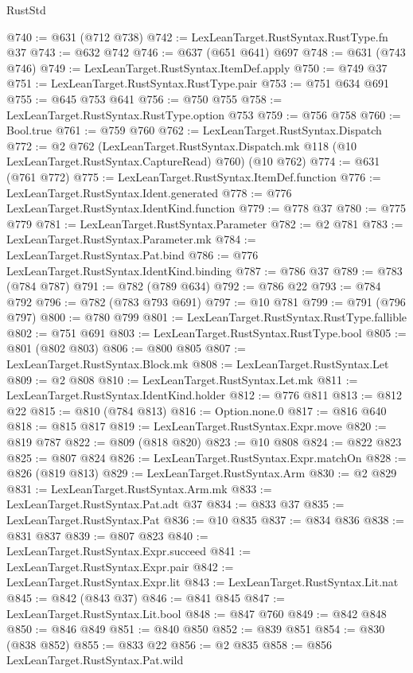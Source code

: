 \begin{lexlean}{RustStd}
\begin{coremodule}
@740 := @631 (@712 @738)
@742 := LexLeanTarget.RustSyntax.RustType.fn @37
@743 := @632 @742
@746 := @637 (@651 @641) @697
@748 := @631 (@743 @746)
@749 := LexLeanTarget.RustSyntax.ItemDef.apply
@750 := @749 @37
@751 := LexLeanTarget.RustSyntax.RustType.pair
@753 := @751 @634 @691
@755 := @645 @753 @641
@756 := @750 @755
@758 := LexLeanTarget.RustSyntax.RustType.option @753
@759 := @756 @758
@760 := Bool.true
@761 := @759 @760
@762 := LexLeanTarget.RustSyntax.Dispatch
@772 := @2
    @762
    (LexLeanTarget.RustSyntax.Dispatch.mk @118 (@10 LexLeanTarget.RustSyntax.CaptureRead) @760)
    (@10 @762)
@774 := @631 (@761 @772)
@775 := LexLeanTarget.RustSyntax.ItemDef.function
@776 := LexLeanTarget.RustSyntax.Ident.generated
@778 := @776 LexLeanTarget.RustSyntax.IdentKind.function
@779 := @778 @37
@780 := @775 @779
@781 := LexLeanTarget.RustSyntax.Parameter
@782 := @2 @781
@783 := LexLeanTarget.RustSyntax.Parameter.mk
@784 := LexLeanTarget.RustSyntax.Pat.bind
@786 := @776 LexLeanTarget.RustSyntax.IdentKind.binding
@787 := @786 @37
@789 := @783 (@784 @787)
@791 := @782 (@789 @634)
@792 := @786 @22
@793 := @784 @792
@796 := @782 (@783 @793 @691)
@797 := @10 @781
@799 := @791 (@796 @797)
@800 := @780 @799
@801 := LexLeanTarget.RustSyntax.RustType.fallible
@802 := @751 @691
@803 := LexLeanTarget.RustSyntax.RustType.bool
@805 := @801 (@802 @803)
@806 := @800 @805
@807 := LexLeanTarget.RustSyntax.Block.mk
@808 := LexLeanTarget.RustSyntax.Let
@809 := @2 @808
@810 := LexLeanTarget.RustSyntax.Let.mk
@811 := LexLeanTarget.RustSyntax.IdentKind.holder
@812 := @776 @811
@813 := @812 @22
@815 := @810 (@784 @813)
@816 := Option.none.{0}
@817 := @816 @640
@818 := @815 @817
@819 := LexLeanTarget.RustSyntax.Expr.move
@820 := @819 @787
@822 := @809 (@818 @820)
@823 := @10 @808
@824 := @822 @823
@825 := @807 @824
@826 := LexLeanTarget.RustSyntax.Expr.matchOn
@828 := @826 (@819 @813)
@829 := LexLeanTarget.RustSyntax.Arm
@830 := @2 @829
@831 := LexLeanTarget.RustSyntax.Arm.mk
@833 := LexLeanTarget.RustSyntax.Pat.adt @37
@834 := @833 @37
@835 := LexLeanTarget.RustSyntax.Pat
@836 := @10 @835
@837 := @834 @836
@838 := @831 @837
@839 := @807 @823
@840 := LexLeanTarget.RustSyntax.Expr.succeed
@841 := LexLeanTarget.RustSyntax.Expr.pair
@842 := LexLeanTarget.RustSyntax.Expr.lit
@843 := LexLeanTarget.RustSyntax.Lit.nat
@845 := @842 (@843 @37)
@846 := @841 @845
@847 := LexLeanTarget.RustSyntax.Lit.bool
@848 := @847 @760
@849 := @842 @848
@850 := @846 @849
@851 := @840 @850
@852 := @839 @851
@854 := @830 (@838 @852)
@855 := @833 @22
@856 := @2 @835
@858 := @856 LexLeanTarget.RustSyntax.Pat.wild

\end{coremodule}
\end{lexlean}
